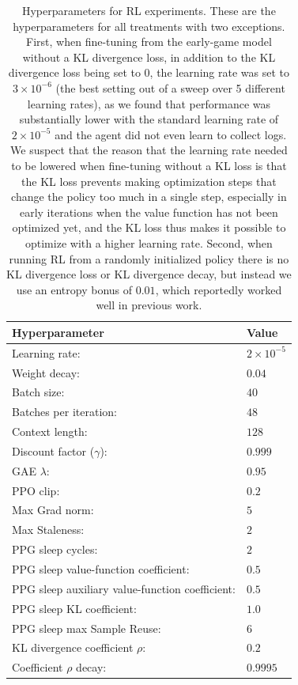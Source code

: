 \begin{table}[h]
\begin{center}
\begin{tabular}{|l|l|}
\hline
 \textbf{Hyperparameter} & \textbf{Value} \\  
 \hline
Learning rate:           & $2\times 10^{-5}$ \\
Weight decay:            & $0.04$     \\
Batch size:              & $40$       \\
Batches per iteration:   & $48$       \\
Context length:          & $128$      \\
Discount factor ($\gamma$): & $0.999$    \\
GAE $\lambda$:            & $0.95$     \\
PPO clip:                & $0.2$      \\
Max Grad norm:           & $5$        \\
Max Staleness:           & $2$        \\
PPG sleep cycles:        & $2$        \\
PPG sleep value-function coefficient:        & $0.5$        \\
PPG sleep auxiliary value-function coefficient:        & $0.5$        \\
PPG sleep KL coefficient:        & $1.0$        \\
PPG sleep max Sample Reuse:    & $6$        \\
KL divergence coefficient $\rho$:                 & $0.2$      \\
Coefficient $\rho$ decay:                & $0.9995$   \\  
\hline
\end{tabular}
\end{center}
\caption{Hyperparameters for RL experiments. These are the hyperparameters for all treatments with two exceptions. First, when fine-tuning from the early-game model without a KL divergence loss, in addition to the KL divergence loss being set to 0, the learning rate was set to $3\times 10^{-6}$ (the best setting out of a sweep over 5 different learning rates), as we found that performance was substantially lower with the standard learning rate of $2\times 10^{-5}$ and the agent did not even learn to collect logs. We suspect that the reason that the learning rate needed to be lowered when fine-tuning without a KL loss is that the KL loss prevents making optimization steps that change the policy too much in a single step, especially in early iterations when the value function has not been optimized yet, and the KL loss thus makes it possible to optimize with a higher learning rate. Second, when running RL from a randomly initialized policy there is no KL divergence loss or KL divergence decay, but instead we use an entropy bonus of $0.01$, which reportedly worked well in previous work.\cite{kanitscheider2021multi}}
\label{tab:rlhyperparameters}
\end{table}


